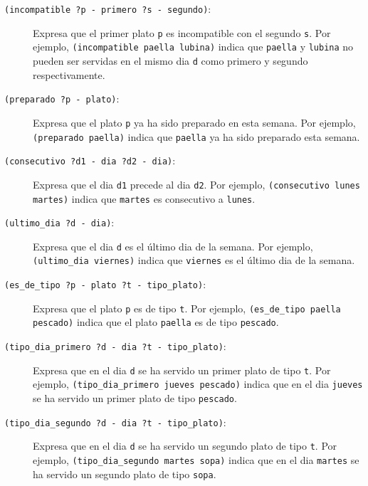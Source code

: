 \begin{description}
  \item[\texttt{(incompatible ?p - primero ?s - segundo)}:]

    Expresa que el primer plato \texttt{p} es incompatible con 
    el segundo \texttt{s}.
    Por ejemplo, \texttt{(incompatible paella lubina)} indica que
    \texttt{paella} y \texttt{lubina} no pueden ser servidas en el mismo dia
    \texttt{d} como primero y segundo respectivamente.

  \item[\texttt{(preparado ?p - plato)}:]

    Expresa que el plato \texttt{p} ya ha sido preparado en esta semana.
    Por ejemplo, \texttt{(preparado paella)} indica que
    \texttt{paella} ya ha sido preparado esta semana.

  \item[\texttt{(consecutivo ?d1 - dia  ?d2 - dia)}:]

    Expresa que el dia \texttt{d1} precede al dia \texttt{d2}.
    Por ejemplo, \texttt{(consecutivo lunes martes)} indica que
    \texttt{martes} es consecutivo a \texttt{lunes}.

  \item[\texttt{(ultimo\_dia ?d - dia)}:]

    Expresa que el dia \texttt{d} es el último dia de la semana.
    Por ejemplo, \texttt{(ultimo\_dia viernes)} indica que
    \texttt{viernes} es el último dia de la semana.

  \item[\texttt{(es\_de\_tipo ?p - plato ?t - tipo\_plato)}:]

    Expresa que 
    el plato \texttt{p} es de tipo \texttt{t}.
    Por ejemplo, \texttt{(es\_de\_tipo paella pescado)} indica que
    el plato \texttt{paella} es de tipo \texttt{pescado}.

  \item[\texttt{(tipo\_dia\_primero ?d - dia ?t - tipo\_plato)}:]

    Expresa que 
    en el dia \texttt{d} se ha servido un primer plato de tipo \texttt{t}.
    Por ejemplo, \texttt{(tipo\_dia\_primero jueves pescado)} indica que
    en el dia \texttt{jueves} se ha servido un primer plato
    de tipo \texttt{pescado}.

  \item[\texttt{(tipo\_dia\_segundo ?d - dia ?t - tipo\_plato)}:]

    Expresa que 
    en el dia \texttt{d} se ha servido un segundo plato de tipo \texttt{t}.
    Por ejemplo, \texttt{(tipo\_dia\_segundo martes sopa)} indica que
    en el dia \texttt{martes} se ha servido un segundo plato
    de tipo \texttt{sopa}.


\end{description}
